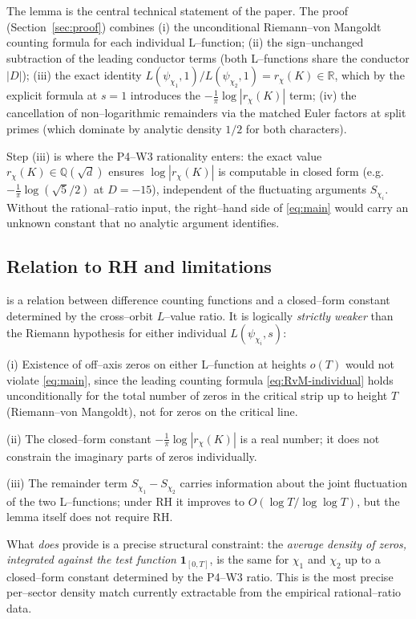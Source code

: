 \documentclass[11pt]{amsart}
\theoremstyle{definition}
\theoremstyle{remark}
\newcommand{\Q}{\mathbb{Q}}
\newcommand{\R}{\mathbb{R}}
\begin{document}
The lemma is the central technical statement of the paper. The proof
(Section~\ref{sec:proof}) combines (i) the unconditional Riemann--von
Mangoldt counting formula for each individual L--function; (ii) the
sign--unchanged subtraction of the leading conductor terms (both
L--functions share the conductor \(|D|\)); (iii) the exact identity
\(L(\psi_{\chi_1}, 1)/L(\psi_{\chi_2}, 1) = r_\chi(K) \in \R\), which by
the explicit formula at \(s = 1\) introduces the
\(-\tfrac{1}{\pi}\log|r_\chi(K)|\) term; (iv) the cancellation of
non--logarithmic remainders via the matched Euler factors at split
primes (which dominate by analytic density \(1/2\) for both
characters).

Step (iii) is where the P4--W3 rationality enters: the
exact value \(r_\chi(K) \in \Q(\sqrt d)\) ensures
\(\log|r_\chi(K)|\) is computable in closed form (e.g.\
\(-\tfrac{1}{\pi}\log(\sqrt 5 / 2)\) at \(D = -15\)), independent of the
fluctuating arguments \(S_{\chi_i}\). Without the rational--ratio
input, the right--hand side of \eqref{eq:main} would carry an
unknown constant that no analytic argument identifies.

\subsection{Relation to RH and limitations}\label{ssec:rel-rh}
 is a relation between difference counting
functions and a closed--form constant determined by the cross--orbit
\(L\)--value ratio. It is logically \emph{strictly weaker} than the
Riemann hypothesis for either individual \(L(\psi_{\chi_i}, s)\):

(i) Existence of off--axis zeros on either L--function at heights
\(o(T)\) would not violate \eqref{eq:main}, since the leading
counting formula \eqref{eq:RvM-individual} holds unconditionally for the
total number of zeros in the critical strip up to height \(T\)
(Riemann--von Mangoldt), not for zeros on the critical line.

(ii) The closed--form constant
\(-\tfrac{1}{\pi}\log|r_\chi(K)|\) is a real number; it does not
constrain the imaginary parts of zeros individually.

(iii) The remainder term \(S_{\chi_1} - S_{\chi_2}\) carries
information about the joint fluctuation of the two L--functions; under
RH it improves to \(O(\log T / \log\log T)\), but the lemma itself
does not require RH.

What  \emph{does} provide is a precise structural
constraint: the \emph{average density of zeros, integrated against
the test function} \(\mathbf 1_{[0, T]}\), is the same for
\(\chi_1\) and \(\chi_2\) up to a closed--form constant determined by
the P4--W3 ratio. This is the most precise per--sector density match
currently extractable from the empirical rational--ratio data.
\end{document}
